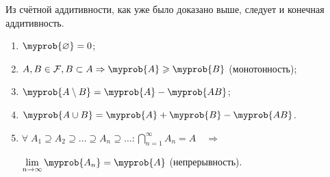 \begin{rmrk}
    Из счётной аддитивности, как уже было доказано выше, следует и конечная аддитивность.
\end{rmrk}

\begin{namedthm}\leavevmode
    \begin{enumerate}
       \item $\myprob{\varnothing}=0$;
        \item $A, B \in \mathcal{F}, B \subset A \Rightarrow \myprob{A} \geqslant \myprob{B}$ (монотонность);
       \item $\myprob{A \setminus B} = \myprob{A} - \myprob{AB}$;
       \item $\myprob{A \cup B} = \myprob{A} + \myprob{B} - \myprob{AB}$.
       \item $ \forall \; A_1 \supseteq A_2 \supseteq \ldots \supseteq A_n \supseteq \ldots \colon \bigcap\limits_{n = 1}^{\infty} A_n = A \quad \Rightarrow$
       
       $\displaystyle \lim_{n \to \infty}\myprob{A_n} = \myprob{A}$ (непрерывность).
    \end{enumerate}
\end{namedthm}

